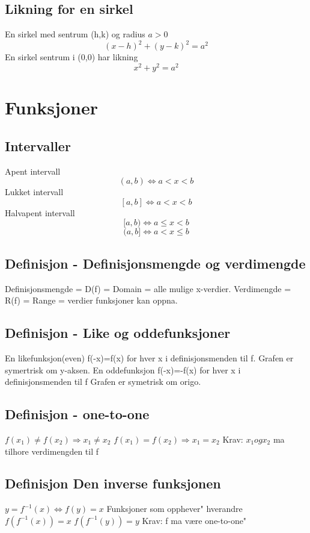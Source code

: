 \documentclass[12pt]{article}
\begin{document}
\subsection*{Likning for en sirkel}
En sirkel med sentrum (h,k) og radius $a>0$
\[(x-h)^{2}+(y-k)^{2}=a^2\]
En sirkel sentrum i (0,0) har likning
\[x^{2}+y^{2}=a^2\]


\newpage\section{Funksjoner}
\subsection*{Intervaller}
Apent intervall
\[(a,b) \Leftrightarrow a<x<b\]
Lukket intervall
\[[a,b] \Leftrightarrow a<x<b\]
Halvapent intervall
\[[a,b) \Leftrightarrow a\leq x<b\]
\[(a,b] \Leftrightarrow a<x\leq b\]
\subsection*{Definisjon - Definisjonsmengde og verdimengde}
Definisjonsmengde = D(f) = Domain = alle mulige x-verdier.
\newline Verdimengde = R(f) = Range = verdier funksjoner kan oppna.
\subsection*{Definisjon - Like og oddefunksjoner}
En likefunksjon(even) 
\newline f(-x)=f(x) for hver x i definisjonsmenden til f.
\newline Grafen er symertrisk om y-aksen.
\newline En oddefunksjon
\newline f(-x)=-f(x) for hver x i definisjonsmenden til f
\newline Grafen er symetrisk om origo.
\subsection*{Definisjon - one-to-one}
$f(x_1)\neq f(x_2) \Rightarrow x_1 \neq x_2$
\newline$f(x_1)=f(x_2) \Rightarrow x_1 = x_2$
\newline Krav: $x_1 og x_2$ ma tilhore verdimengden til f
\subsection*{Definisjon Den inverse funksjonen}
$y=f^{-1}(x) \Leftrightarrow f(y)=x$
\newline Funksjoner som opphever" hverandre
\newline$f(f^{-1}(x))=x$
\newline$f(f^{-1}(y))=y$
\newline Krav: f ma være one-to-one"
\end{document}
